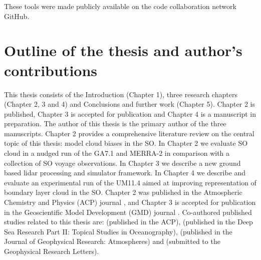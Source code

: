 \noindent
These tools were made publicly available on the code collaboration network
GitHub.

\section{Outline of the thesis and author's contributions}

This thesis consists of the Introduction (Chapter 1), three research chapters
(Chapter 2, 3 and 4) and Conclusions and further work (Chapter 5).
Chapter 2 is published, Chapter 3 is accepted for publication
and Chapter 4 is a manuscript in preparation.
The author of this thesis is the primary author of the three manuscripts.
Chapter 2 provides a comprehensive literature review on the central topic
of this thesis: model cloud biases in the SO. In Chapter 2 we evaluate
SO cloud in a nudged run of the GA7.1 and MERRA-2 in comparison
with a collection of SO voyage observations. In Chapter 3 we
describe a new ground based lidar processing and simulator framework.
In Chapter 4 we describe and evaluate an experimental run of the UM11.4 aimed at
improving representation of boundary layer cloud in the SO.
Chapter 2 was published in the Atmospheric
Chemistry and Physics (ACP) journal \citep{kuma2020a}, and Chapter 3 is
accepted for publication in the Geoscientific Model Development (GMD) journal \citep{kuma2020b}.
Co-authored published studies related to this thesis are: \cite{jolly2018}
(published in the ACP), \cite{klekociuk2020} (published in the Deep Sea Research Part II: Topical Studies in Oceanography), \cite{hartery2020a}
(published in the Journal of Geophysical Research: Atmospheres) and
\cite{hartery2020b} (submitted to the Geophysical Research Letters).
